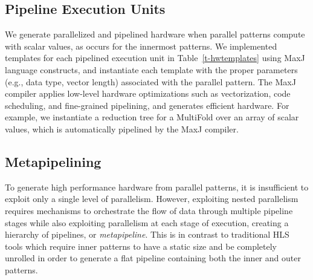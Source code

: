 

\subsection{Pipeline Execution Units}
We generate parallelized and pipelined hardware when parallel patterns compute with scalar values,
as occurs for the innermost patterns.
We implemented templates for each
pipelined execution unit in Table~\ref{t-hwtemplates} using MaxJ language
constructs, and instantiate each template with the proper parameters (e.g., data type,
vector length) associated with the parallel pattern.  The MaxJ compiler
applies low-level hardware optimizations such as vectorization, code
scheduling, and fine-grained pipelining, and generates efficient hardware.  For
example, we instantiate a reduction tree for a MultiFold over an
array of scalar values, which is automatically pipelined by the MaxJ compiler.



\subsection{Metapipelining}
To generate high performance hardware from parallel patterns, it is insufficient to exploit only a single level of parallelism.
However, exploiting nested parallelism requires mechanisms to orchestrate
the flow of data through multiple pipeline stages while also exploiting parallelism at each stage of execution,
creating a hierarchy of pipelines, or \emph{metapipeline}.
This is in contrast to traditional HLS tools which require inner patterns to have a static size and be completely unrolled in order to generate a flat pipeline containing both the inner and outer patterns.


